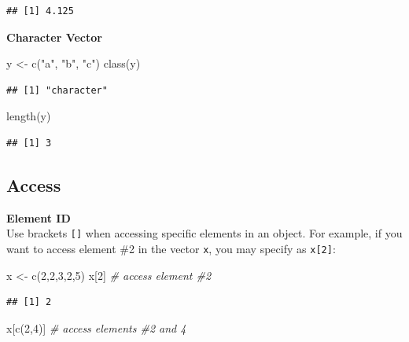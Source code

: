 \documentclass[
]{book}
\newenvironment{Shaded}{\begin{snugshade}}{\end{snugshade}}
\newcommand{\CommentTok}[1]{\textcolor[rgb]{0.56,0.35,0.01}{\textit{#1}}}
\newcommand{\DecValTok}[1]{\textcolor[rgb]{0.00,0.00,0.81}{#1}}
\newcommand{\FunctionTok}[1]{\textcolor[rgb]{0.00,0.00,0.00}{#1}}
\newcommand{\NormalTok}[1]{#1}
\newcommand{\OtherTok}[1]{\textcolor[rgb]{0.56,0.35,0.01}{#1}}
\newcommand{\StringTok}[1]{\textcolor[rgb]{0.31,0.60,0.02}{#1}}
\begin{document}
\begin{verbatim}
## [1] 4.125
\end{verbatim}

\textbf{Character Vector}

\begin{Shaded}
\begin{Highlighting}[]
\NormalTok{y }\OtherTok{\textless{}{-}} \FunctionTok{c}\NormalTok{(}\StringTok{"a"}\NormalTok{, }\StringTok{"b"}\NormalTok{, }\StringTok{"c"}\NormalTok{)}
\FunctionTok{class}\NormalTok{(y)}
\end{Highlighting}
\end{Shaded}

\begin{verbatim}
## [1] "character"
\end{verbatim}

\begin{Shaded}
\begin{Highlighting}[]
\FunctionTok{length}\NormalTok{(y)}
\end{Highlighting}
\end{Shaded}

\begin{verbatim}
## [1] 3
\end{verbatim}

\hypertarget{access}{%
\subsection{Access}\label{access}}

\textbf{Element ID}\\
Use brackets \texttt{{[}{]}} when accessing specific elements in an object. For example, if you want to access element \#2 in the vector \texttt{x}, you may specify as \texttt{x{[}2{]}}:

\begin{Shaded}
\begin{Highlighting}[]
\NormalTok{x }\OtherTok{\textless{}{-}} \FunctionTok{c}\NormalTok{(}\DecValTok{2}\NormalTok{,}\DecValTok{2}\NormalTok{,}\DecValTok{3}\NormalTok{,}\DecValTok{2}\NormalTok{,}\DecValTok{5}\NormalTok{)}
\NormalTok{x[}\DecValTok{2}\NormalTok{] }\CommentTok{\# access element \#2}
\end{Highlighting}
\end{Shaded}

\begin{verbatim}
## [1] 2
\end{verbatim}

\begin{Shaded}
\begin{Highlighting}[]
\NormalTok{x[}\FunctionTok{c}\NormalTok{(}\DecValTok{2}\NormalTok{,}\DecValTok{4}\NormalTok{)] }\CommentTok{\# access elements \#2 and 4}
\end{Highlighting}
\end{Shaded}
\end{document}
